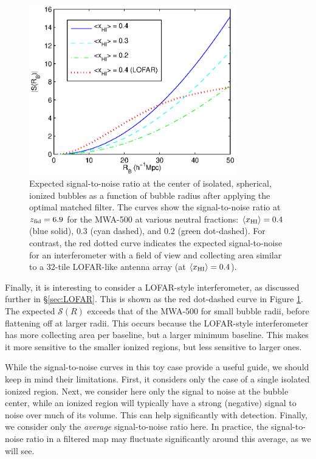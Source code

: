 \begin{figure}[h]
  \centering
  \includegraphics[width=9cm]{f4.eps}
  \caption{Expected signal-to-noise ratio at the center of
            isolated, spherical, ionized bubbles as a function of bubble
            radius after applying the optimal matched filter. The
curves show the signal-to-noise ratio at $z_{\rm fid} = 6.9$ for the
MWA-500 at various neutral fractions: $\langle x_{\text{HI}}\rangle = 0.4$ (blue solid), $0.3$
            (cyan dashed), and $0.2$ (green dot-dashed). For contrast, the red dotted curve indicates the
            expected signal-to-noise for an interferometer 
with a field of view and collecting area
            similar to a 32-tile LOFAR-like antenna array (at $\langle x_{\text{HI}}\rangle = 0.4$).}
  \label{fig:ToySNR}
\end{figure}


Finally, it is interesting to consider a LOFAR-style interferometer, as 
discussed further
in \S\ref{sec:LOFAR}. This is shown as the red dot-dashed curve in Figure \ref{fig:ToySNR}.
The expected $\mathcal{S}(R)$ exceeds that of the MWA-500 for small bubble radii, before
flattening off at larger radii. This occurs because the LOFAR-style interferometer
has more collecting area per baseline, but a larger minimum baseline. This makes it
more sensitive to the smaller ionized regions, but less sensitive to larger ones.

While the signal-to-noise curves in this toy case provide a useful guide, we should keep in mind their limitations. 
First, it considers only the case of a single isolated ionized region. Next, we consider here only
the signal to noise at the bubble center, while an ionized region will typically have
a strong (negative) signal to noise over much of its volume. This can help significantly with
detection. Finally, we consider only the {\em average} signal-to-noise ratio here. In
practice, the signal-to-noise ratio in a filtered map may fluctuate significantly around
this average, as we will see.

